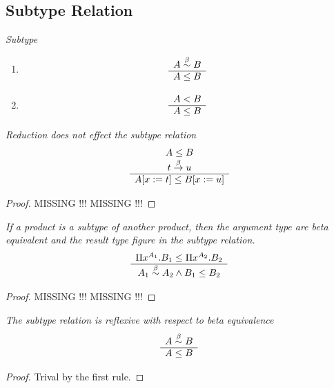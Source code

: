 \subsection{Subtype Relation}


\begin{definition}
    \emph{Subtype}
    \begin{enumerate}
    \item
        $$
        \begin{array}{c} 
            A \stackrel{\beta}{\sim} B
         \\ \hline 
            A \le B
        \end{array}
        $$

    \item
        $$
        \begin{array}{c} 
            A < B
         \\ \hline 
            A \le B
        \end{array}
        $$
    \end{enumerate}
\end{definition}



\begin{theorem}
    \label{SubtypeReduction}
    \emph{Reduction does not effect the subtype relation}
    $$
    \begin{array}{c} 
        A \le B
        \\
        t \stackrel{\beta}{\to} u
     \\ \hline 
        A[x:=t] \le B[x:=u]
    \end{array}
    $$

    \begin{proof}
        MISSING !!! MISSING !!!
    \end{proof}
\end{theorem}



\begin{theorem}
    \label{SubtypeProduct}
    \emph{If a product is a subtype of another product, then the argument type
    are beta equivalent and the result type figure in the subtype relation.}
    $$
    \begin{array}{c} 
        \Pi x^{A_1}. B_1 \le \Pi x^{A_2}. B_2
     \\ \hline 
        A_1 \stackrel{\beta}{\sim} A_2 \land B_1 \le B_2
    \end{array}
    $$

    \begin{proof}
        MISSING !!! MISSING !!!
    \end{proof}
\end{theorem}



\begin{theorem}
    \emph{The subtype relation is reflexive with respect to beta equivalence}
    $$
    \begin{array}{c} 
        A \stackrel{\beta}{\sim} B
     \\ \hline 
        A \le B
    \end{array}
    $$
    \begin{proof} Trival by the first rule.
    \end{proof}
\end{theorem}






